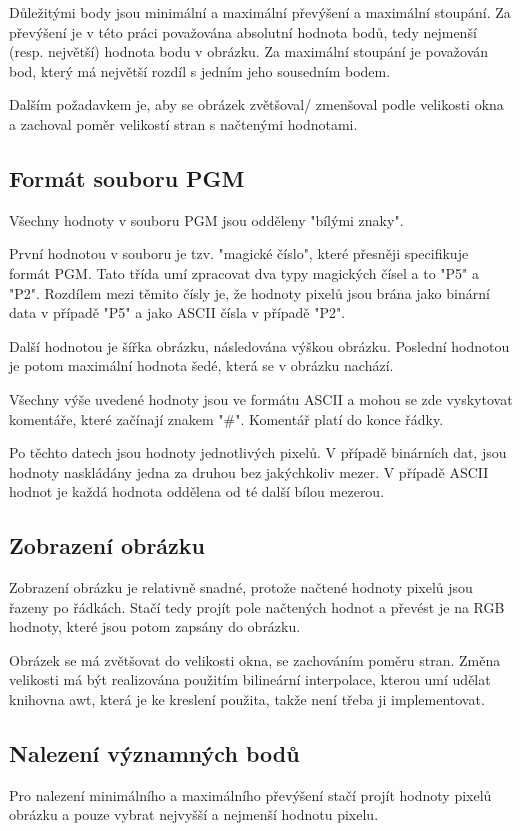 \documentclass[12pt]{report}
\begin{document}
Důležitými body jsou minimální a maximální převýšení a maximální stoupání. Za převýšení
je v této práci považována absolutní hodnota bodů, tedy nejmenší (resp. největší) hodnota bodu
v obrázku. Za maximální stoupání je považován bod, který má největší rozdíl s jedním jeho
sousedním bodem.

Dalším požadavkem je, aby se obrázek zvětšoval/ zmenšoval podle velikosti okna a zachoval poměr
velikostí stran s načtenými hodnotami.
%
\subsection{Formát souboru PGM}
Všechny hodnoty v souboru PGM jsou odděleny "bílými znaky".

První hodnotou v souboru je tzv. "magické číslo", které přesněji specifikuje formát PGM. Tato třída umí
zpracovat dva typy magických čísel a to "P5" a "P2". Rozdílem mezi těmito čísly je, že hodnoty pixelů
jsou brána jako binární data v případě "P5" a jako ASCII čísla v případě "P2".

Další hodnotou je šířka obrázku, následována výškou obrázku. Poslední hodnotou je potom maximální hodnota
šedé, která se v obrázku nachází.

Všechny výše uvedené hodnoty jsou ve formátu ASCII a mohou se zde vyskytovat komentáře, které začínají 
znakem "\#". Komentář platí do konce řádky.

Po těchto datech jsou hodnoty jednotlivých pixelů. V případě binárních dat, jsou hodnoty naskládány 
jedna za druhou bez jakýchkoliv mezer. V případě ASCII hodnot je každá hodnota oddělena od té další
bílou mezerou.
%
\subsection{Zobrazení obrázku}
Zobrazení obrázku je relativně snadné, protože načtené hodnoty pixelů jsou řazeny po řádkách. Stačí
tedy projít pole načtených hodnot a převést je na RGB hodnoty, které jsou potom zapsány do obrázku.

Obrázek se má zvětšovat do velikosti okna, se zachováním poměru stran. Změna velikosti má být realizována
použitím bilineární interpolace, kterou umí udělat knihovna awt, která je ke kreslení použita, takže
není třeba ji implementovat.
\subsection{Nalezení významných bodů}\label{points_alg}
Pro nalezení minimálního a maximálního převýšení stačí projít hodnoty pixelů obrázku a pouze vybrat
nejvyšší a nejmenší hodnotu pixelu.
\end{document}
